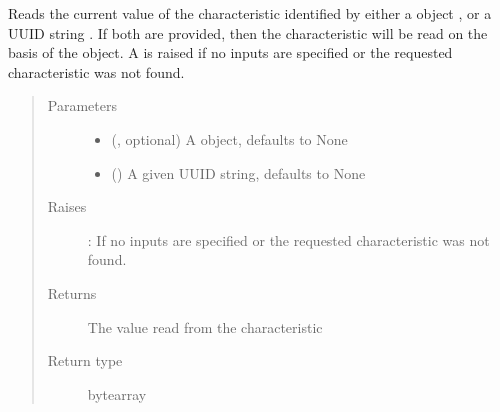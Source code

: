 \documentclass[letterpaper,10pt,english]{sphinxmanual}
\begin{document}
\begin{fulllineitems}
\begin{fulllineitems}
\label{\detokenize{PandaBot:PandaBot.PandaBotClient.readCharacteristic}}
Reads the current value of the characteristic identified by either a  object , or a UUID string . If both are provided, then the characteristic will be read on the basis of the  object. A  is raised if no inputs are specified or the requested characteristic was not found.
\begin{quote}\begin{description}
\item[{Parameters}] \leavevmode\begin{itemize}
\item {} 
 (, optional) \textendash{} A  object, defaults to None

\item {} 
 (\sphinxstyleliteralemphasis{\sphinxupquote{, }}) \textendash{} A given UUID string, defaults to None

\end{itemize}

\item[{Raises}] \leavevmode
{}: If no inputs are specified or the requested characteristic was not found.

\item[{Returns}] \leavevmode
The value read from the characteristic

\item[{Return type}] \leavevmode
bytearray

\end{description}\end{quote}

\end{fulllineitems}



\end{fulllineitems}
\end{document}
